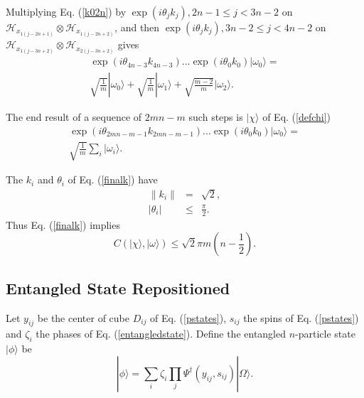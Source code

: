 \documentclass[12pt,amsmath,amssymb,onecolumn]{revtex4-2}
\begin{document}
Multiplying Eq. (\ref{k02n}) by $\exp(i\theta_jk_j), 2n-1 \le j < 3n-2$ on
$\mathcal{H}_{x_{1(j-2n+1)}} \otimes \mathcal{H}_{x_{1(j-2n +2)}}$, 
and then $\exp(i\theta_jk_j), 3n -2 \le j < 4n -2$ on
$\mathcal{H}_{x_{1(j-3n+2)}} \otimes \mathcal{H}_{x_{2(j-3n+2)}}$ gives
\begin{multline}
\label{k04n}
\exp( i \theta_{4n-3} k_{4n-3}) ... \exp( i \theta_0 k_0) |\omega_0 \rangle  = \\
\sqrt{\frac{1}{m}} |\omega_0 \rangle  +
\sqrt{\frac{1}{m}} |\omega_1 \rangle  + 
\sqrt{\frac{m - 2}{m}} |\omega_2 \rangle .
\end{multline}

The end result of a sequence of $2mn - m$ such steps is
$|\chi \rangle $ of Eq. (\ref{defchi})
\begin{multline}
\label{finalk}
\exp( i \theta_{2mn-m-1} k_{2mn-m-1}) ... \exp( i \theta_0 k_0) |\omega_0 \rangle  = \\
\sqrt{\frac{1}{m}} \sum_i |\omega_i \rangle .
\end{multline}

The $k_i$ and $\theta_i$ of Eq. (\ref{finalk}) have
\begin{subequations}
\begin{eqnarray}
\label{normfinalk}
\parallel k_i \parallel & = & \sqrt{2},\\
\label{normfinaltheta}
| \theta_i | & \le & \frac{\pi}{2}.
\end{eqnarray}
\end{subequations}
Thus  Eq. (\ref{finalk}) implies
\begin{equation}
\label{deltac}
C( |\chi \rangle , |\omega \rangle ) \le \sqrt{2} \pi m (n - \frac{1}{2}).
\end{equation}


\subsection{\label{app:subsectionsecond}Entangled State Repositioned}

Let $y_{ij}$ be the center of cube $D_{ij}$ of Eq. (\ref{pstates}), $s_{ij}$ the spins of Eq. (\ref{pstates})
and $\zeta_i$ the phases of Eq. (\ref{entangledstate}). Define the entangled $n$-particle state
$|\phi \rangle $ be
\begin{equation}
\label{phinpoints}
|\phi \rangle  = \sum_{i} \zeta_i \prod_j \Psi^{\dagger}( y_{ij}, s_{ij}) |\Omega \rangle .
\end{equation}
\end{document}

